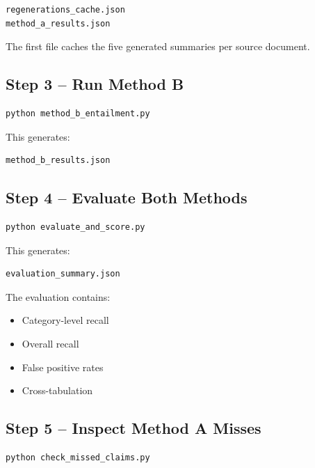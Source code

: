 \documentclass[11pt,a4paper]{article}
\begin{document}
\begin{lstlisting}
regenerations_cache.json
method_a_results.json
\end{lstlisting}

The first file caches the five generated summaries per source document.

\subsection{Step 3 -- Run Method B}

\begin{lstlisting}[language=bash]
python method_b_entailment.py
\end{lstlisting}

This generates:

\begin{lstlisting}
method_b_results.json
\end{lstlisting}

\subsection{Step 4 -- Evaluate Both Methods}

\begin{lstlisting}[language=bash]
python evaluate_and_score.py
\end{lstlisting}

This generates:

\begin{lstlisting}
evaluation_summary.json
\end{lstlisting}

The evaluation contains:

\begin{itemize}
    \item Category-level recall
    \item Overall recall
    \item False positive rates
    \item Cross-tabulation
\end{itemize}

\subsection{Step 5 -- Inspect Method A Misses}

\begin{lstlisting}[language=bash]
python check_missed_claims.py
\end{lstlisting}
\end{document}
